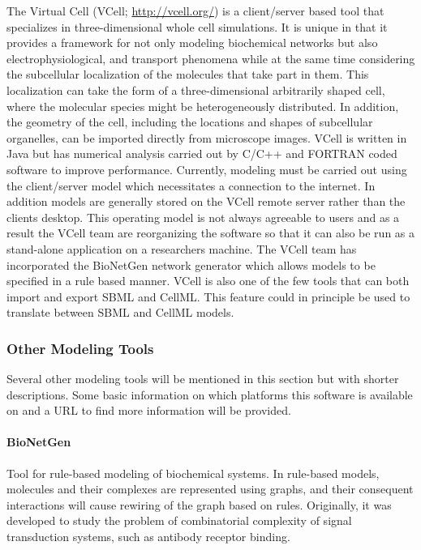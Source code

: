 The Virtual Cell (VCell; \url{http://vcell.org/}) \autocite{VCELL}
\autocite{moraru2008virtual} is a client/server based tool that
specializes in three-dimensional whole cell simulations. It is unique in
that it provides a framework for not only modeling biochemical networks
but also electrophysiological, and transport phenomena while at the same
time considering the subcellular localization of the molecules that take
part in them. This localization can take the form of a three-dimensional
arbitrarily shaped cell, where the molecular species might be
heterogeneously distributed. In addition, the geometry of the cell,
including the locations and shapes of subcellular organelles, can be
imported directly from microscope images. VCell is written in Java but
has numerical analysis carried out by C/C++ and FORTRAN coded software
to improve performance. Currently, modeling must be carried out using
the client/server model which necessitates a connection to the internet.
In addition models are generally stored on the VCell remote server
rather than the clients desktop. This operating model is not always
agreeable to users and as a result the VCell team are reorganizing the
software so that it can also be run as a stand-alone application on a
researchers machine. The VCell team has incorporated the BioNetGen
\autocite{blinov2004bionetgen} network generator which allows models to
be specified in a rule based manner. VCell is also one of the few tools
that can both import and export SBML and CellML. This feature could in
principle be used to translate between SBML and CellML models.

\subsubsection{Other Modeling Tools}

Several other modeling tools will be mentioned in this section but with
shorter descriptions. Some basic information on which platforms this
software is available on and a URL to find more information will be
provided.

\paragraph{BioNetGen \autocite{blinov2004bionetgen}}

Tool for rule-based modeling of biochemical systems. In rule-based
models, molecules and their complexes are represented using graphs, and
their consequent interactions will cause rewiring of the graph based on
rules. Originally, it was developed to study the problem of
combinatorial complexity of signal transduction systems, such as
antibody receptor binding.

